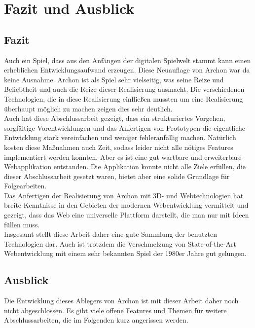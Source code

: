 
\chapter{Fazit und Ausblick}
\label{cha:fazit}

\section{Fazit}
\label{sec:Schlussfolgerung}

Auch ein Spiel, dass aus den Anfängen der digitalen Spielwelt stammt kann einen erheblichen Entwicklungsaufwand erzeugen. Diese Neuauflage von Archon war da keine Ausnahme. Archon ist als Spiel sehr vielseitig, was seine Reize und Beliebtheit und auch die Reize dieser Realisierung ausmacht. Die verschiedenen Technologien, die in diese Realisierung einfließen mussten um eine Realisierung überhaupt möglich zu machen zeigen dies sehr deutlich.\\
Auch hat diese Abschlussarbeit gezeigt, dass ein strukturiertes Vorgehen, sorgfältige Vorentwicklungen und das Anfertigen von Prototypen die eigentliche Entwicklung stark vereinfachen und weniger fehleranfällig machen. Natürlich kosten diese Maßnahmen auch Zeit, sodass leider nicht alle nötiges Features implementiert werden konnten. Aber es ist eine gut wartbare und erweiterbare Webapplikation entstanden. Die Applikation konnte nicht alle Ziele erfüllen, die dieser Abschlussarbeit gesetzt waren, bietet aber eine solide Grundlage für Folgearbeiten.\\
Das Anfertigen der Realisierung von Archon mit 3D- und Webtechnologien hat breite Kenntnisse in den Gebieten der modernen Webentwicklung vermittelt und gezeigt, dass das Web eine universelle Plattform darstellt, die man nur mit Ideen füllen muss.\\
Insgesamt stellt diese Arbeit daher eine gute Sammlung der benutzten Technologien dar. Auch ist trotzdem die Verschmelzung von State-of-the-Art Webentwicklung mit einem sehr bekannten Spiel der 1980er Jahre gut gelungen.


\section{Ausblick}
\label{sec:Ausblick}

Die Entwicklung dieses Ablegers von Archon ist mit dieser Arbeit daher noch nicht abgeschlossen. Es gibt viele offene Features und Themen für weitere Abschlussarbeiten, die im Folgenden kurz angerissen werden.

